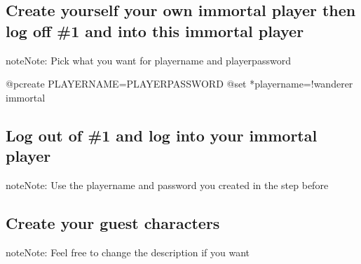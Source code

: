 \documentclass[letterpaper,10pt,english]{sphinxmanual}
\begin{document}
\begin{sphinxVerbatim}[commandchars=\\\{\}]
 
 
\end{sphinxVerbatim}


\subsection{Create yourself your own immortal player then log off \#1 and into this immortal player}
\label{\detokenize{gettingstarted:create-yourself-your-own-immortal-player-then-log-off-1-and-into-this-immortal-player}}
\begin{sphinxadmonition}{note}{Note:}
\sphinxAtStartPar
Pick what you want for playername and playerpassword
\end{sphinxadmonition}

\begin{sphinxVerbatim}[commandchars=\\\{\}]
@pcreate PLAYERNAME=PLAYERPASSWORD
@set *playername=!wanderer immortal
\end{sphinxVerbatim}


\subsection{Log out of \#1 and log into your immortal player}
\label{\detokenize{gettingstarted:log-out-of-1-and-log-into-your-immortal-player}}
\begin{sphinxadmonition}{note}{Note:}
\sphinxAtStartPar
Use the playername and password you created in the step before
\end{sphinxadmonition}

\begin{sphinxVerbatim}[commandchars=\\\{\}]
  
\end{sphinxVerbatim}


\subsection{Create your guest characters}
\label{\detokenize{gettingstarted:create-your-guest-characters}}
\begin{sphinxadmonition}{note}{Note:}
\sphinxAtStartPar
Feel free to change the description if you want
\end{sphinxadmonition}
\end{document}

